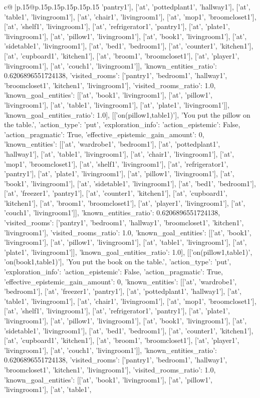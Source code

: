 \documentclass{article}
\begin{document}
{\begin{supertabular}{c@{$\;$}|p{.15\linewidth}@{}p{.15\linewidth}p{.15\linewidth}p{.15\linewidth}p{.15\linewidth}p{.15\linewidth}}
{{{'pantry1'], ['at', 'pottedplant1', 'hallway1'], ['at', 'table1', 'livingroom1'], ['at', 'chair1', 'livingroom1'], ['at', 'mop1', 'broomcloset1'], ['at', 'shelf1', 'livingroom1'], ['at', 'refrigerator1', 'pantry1'], ['at', 'plate1', 'livingroom1'], ['at', 'pillow1', 'livingroom1'], ['at', 'book1', 'livingroom1'], ['at', 'sidetable1', 'livingroom1'], ['at', 'bed1', 'bedroom1'], ['at', 'counter1', 'kitchen1'], ['at', 'cupboard1', 'kitchen1'], ['at', 'broom1', 'broomcloset1'], ['at', 'player1', 'livingroom1'], ['at', 'couch1', 'livingroom1']], 'known_entities_ratio': 0.6206896551724138, 'visited_rooms': ['pantry1', 'bedroom1', 'hallway1', 'broomcloset1', 'kitchen1', 'livingroom1'], 'visited_rooms_ratio': 1.0, 'known_goal_entities': [['at', 'book1', 'livingroom1'], ['at', 'pillow1', 'livingroom1'], ['at', 'table1', 'livingroom1'], ['at', 'plate1', 'livingroom1']], 'known_goal_entities_ratio': 1.0}}], [['on(pillow1,table1)'], 'You put the pillow on the table.', {'action_type': 'put', 'exploration_info': {'action_epistemic': False, 'action_pragmatic': True, 'effective_epistemic_gain_amount': 0, 'known_entities': [['at', 'wardrobe1', 'bedroom1'], ['at', 'pottedplant1', 'hallway1'], ['at', 'table1', 'livingroom1'], ['at', 'chair1', 'livingroom1'], ['at', 'mop1', 'broomcloset1'], ['at', 'shelf1', 'livingroom1'], ['at', 'refrigerator1', 'pantry1'], ['at', 'plate1', 'livingroom1'], ['at', 'pillow1', 'livingroom1'], ['at', 'book1', 'livingroom1'], ['at', 'sidetable1', 'livingroom1'], ['at', 'bed1', 'bedroom1'], ['at', 'freezer1', 'pantry1'], ['at', 'counter1', 'kitchen1'], ['at', 'cupboard1', 'kitchen1'], ['at', 'broom1', 'broomcloset1'], ['at', 'player1', 'livingroom1'], ['at', 'couch1', 'livingroom1']], 'known_entities_ratio': 0.6206896551724138, 'visited_rooms': ['pantry1', 'bedroom1', 'hallway1', 'broomcloset1', 'kitchen1', 'livingroom1'], 'visited_rooms_ratio': 1.0, 'known_goal_entities': [['at', 'book1', 'livingroom1'], ['at', 'pillow1', 'livingroom1'], ['at', 'table1', 'livingroom1'], ['at', 'plate1', 'livingroom1']], 'known_goal_entities_ratio': 1.0}}], [['on(pillow1,table1)', 'on(book1,table1)'], 'You put the book on the table.', {'action_type': 'put', 'exploration_info': {'action_epistemic': False, 'action_pragmatic': True, 'effective_epistemic_gain_amount': 0, 'known_entities': [['at', 'wardrobe1', 'bedroom1'], ['at', 'freezer1', 'pantry1'], ['at', 'pottedplant1', 'hallway1'], ['at', 'table1', 'livingroom1'], ['at', 'chair1', 'livingroom1'], ['at', 'mop1', 'broomcloset1'], ['at', 'shelf1', 'livingroom1'], ['at', 'refrigerator1', 'pantry1'], ['at', 'plate1', 'livingroom1'], ['at', 'pillow1', 'livingroom1'], ['at', 'book1', 'livingroom1'], ['at', 'sidetable1', 'livingroom1'], ['at', 'bed1', 'bedroom1'], ['at', 'counter1', 'kitchen1'], ['at', 'cupboard1', 'kitchen1'], ['at', 'broom1', 'broomcloset1'], ['at', 'player1', 'livingroom1'], ['at', 'couch1', 'livingroom1']], 'known_entities_ratio': 0.6206896551724138, 'visited_rooms': ['pantry1', 'bedroom1', 'hallway1', 'broomcloset1', 'kitchen1', 'livingroom1'], 'visited_rooms_ratio': 1.0, 'known_goal_entities': [['at', 'book1', 'livingroom1'], ['at', 'pillow1', 'livingroom1'], ['at', 'table1', }}}
\end{supertabular}}
\end{document}
